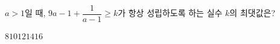 $a>1$일 때, $9a-1+\dfrac{1}{a-1}\ge k$가 항상 성립하도록 하는 실수 $k$의 최댓값은?
\begin{choices32}{$8$}{$10$}{$12$}{$14$}{$16$}\end{choices32}
